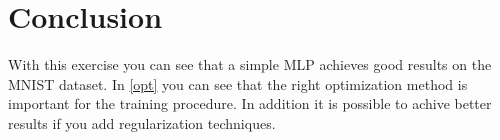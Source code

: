 \documentclass[a4paper,12pt]{article}
\begin{document}
\section{Conclusion}
With this exercise you can see that a simple MLP achieves good results on the MNIST dataset. In \autoref{opt} you can see that the right optimization method is important for the training procedure. In addition it is possible to achive better results if you add regularization techniques.
\end{document}
